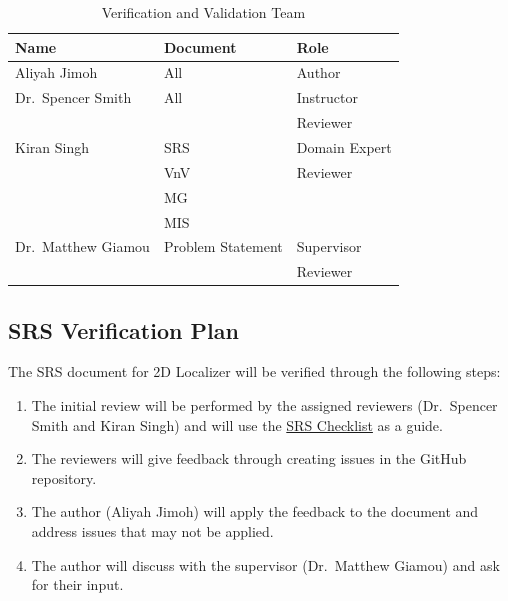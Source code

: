 \documentclass[12pt, titlepage]{article}
\begin{document}
\begin{center}
  \begin{table}[h]
    \centering
    
    \begin{tabular}{|l|l|p{5cm}|}
        \hline
        \textbf{Name} & \textbf{Document} & \textbf{Role} \\
        \hline
        Aliyah Jimoh & All & Author\\
        \hline
        Dr.~Spencer Smith & All & Instructor \\
                          &     & Reviewer\\
        \hline
        Kiran Singh & SRS & Domain Expert\\
                    & VnV & Reviewer      \\
                    & MG &       \\
                    & MIS &       \\
        \hline
        Dr.~Matthew Giamou & Problem Statement & Supervisor \\
                           &                   & Reviewer \\
        \hline
    \end{tabular}

    \caption{Verification and Validation Team}
    \label{table:vnvTeam}
\end{table}
\end{center}

\subsection{SRS Verification Plan}\label{plan_SRS}

The SRS document for 2D Localizer will be verified through the following steps:
\begin{enumerate}
  \item The initial review will be performed by the assigned reviewers (Dr.~Spencer Smith and Kiran Singh) and will use the \href{https://github.com/AliyahJimoh/2D-Localizer/blob/main/docs/Checklists/SRS-Checklist.pdf}{SRS Checklist} as a guide.
  \item The reviewers will give feedback through creating issues in the GitHub repository.
  \item The author (Aliyah Jimoh) will apply the feedback to the document and address issues that may not be applied.
  \item The author will discuss with the supervisor (Dr.~Matthew Giamou) and ask for their input.
\end{enumerate}
\end{document}
